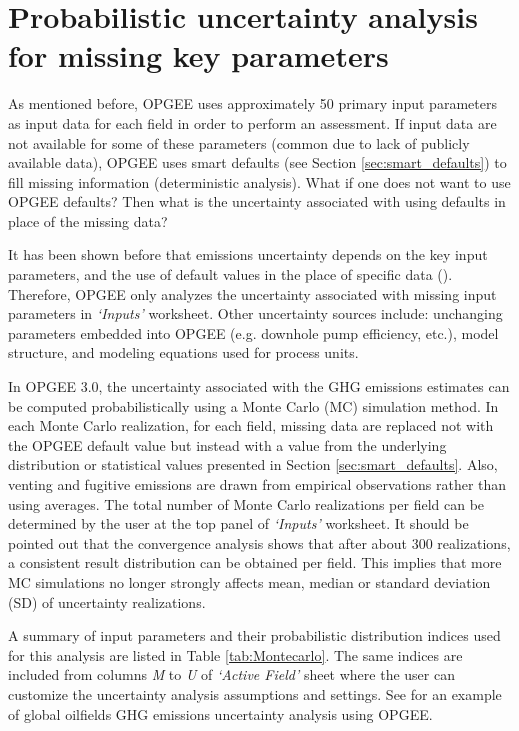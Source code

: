 \documentclass[11pt]{report}
\newcommand{\sheet}[1]{\textit{`{#1}'}}
\begin{document}
\section{Probabilistic uncertainty analysis for missing key parameters}
\label{sec:Montecarlo}

As mentioned before, OPGEE uses approximately 50 primary input parameters as input data for each field in order to perform an assessment. If input data are not available for some of these parameters (common due to lack of publicly available data), OPGEE uses smart defaults (see Section \ref{sec:smart_defaults}) to fill missing information (deterministic analysis). What if one does not want to use OPGEE defaults? Then what is the uncertainty associated with using defaults in place of the missing data?

It has been shown before that emissions uncertainty depends on the key input parameters, and the use of default values in the place of specific data (\cite{brandt2014uncertainty,vafi2014uncertainty}). Therefore, OPGEE only analyzes the uncertainty associated with missing input parameters in \sheet{Inputs} worksheet. Other uncertainty sources include: unchanging parameters embedded into OPGEE (e.g. downhole pump efficiency, etc.), model structure, and modeling equations used for process units.

In OPGEE 3.0, the uncertainty associated with the GHG emissions estimates can be computed probabilistically using a Monte Carlo (MC) simulation method. In each Monte Carlo realization, for each field, missing data are replaced not with the OPGEE default value but instead with a value from the underlying distribution or statistical values presented in Section \ref{sec:smart_defaults}. Also, venting and fugitive emissions are drawn from empirical observations rather than using averages. The total number of Monte Carlo realizations per field can be determined by the user at the top panel of \sheet{Inputs} worksheet. It should be pointed out that the convergence analysis shows that after about 300 realizations, a consistent result distribution can be obtained per field. This implies that more MC simulations no longer strongly affects mean, median or standard deviation (SD) of uncertainty realizations. 

A summary of input parameters and their probabilistic distribution indices used for this analysis are listed in Table \ref{tab:Montecarlo}. The same indices are included from columns \emph{M} to \emph{U} of \sheet{Active Field} sheet where the user can customize the uncertainty analysis assumptions and settings. See \cite{Masnadi2018} for an example of global oilfields GHG emissions uncertainty analysis using OPGEE.
\end{document}
